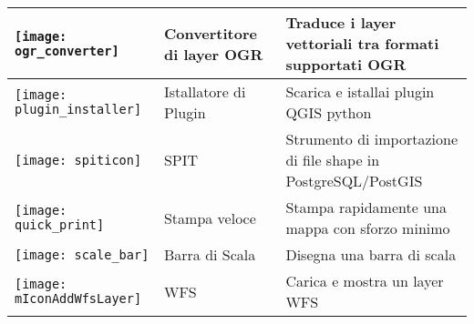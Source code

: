 \begin{minipage}{\textwidth}
\begin{table}[H]
\begin{tabular}{|l|l|p{4in}|}
\hline
\texttt{[image: ogr\_converter]}
 & Convertitore di layer OGR \index{plugins!Convertitore OGR} & Traduce i layer vettoriali tra formati supportati OGR\\
\hline
\texttt{[image: plugin\_installer]}
 & Istallatore di Plugin  \index{plugins!Istallatore di Plugin} & Scarica e istallai plugin QGIS python\\
\hline
\texttt{[image: spiticon]}
 & SPIT \index{plugins!spit}& Strumento di importazione di file shape in PostgreSQL/PostGIS \\
\hline
\texttt{[image: quick\_print]}
 & Stampa veloce \index{plugins!Stampa veloce}& Stampa rapidamente una mappa con sforzo minimo \\
\hline
\texttt{[image: scale\_bar]}
 & Barra di Scala \index{plugins!barra di scala}& Disegna una barra di scala\\
\hline
\texttt{[image: mIconAddWfsLayer]}
 & WFS & Carica e mostra un layer WFS\\
\hline
\end{tabular}
\end{table}
\end{minipage}

\normalsize

\begin{Tip}\caption{\textsc{Impostazioni dei plugin salvate nel progetto}}
\end{Tip}
